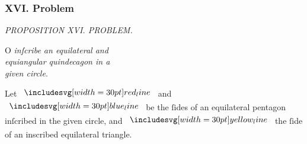 \documentclass[11pt,preview]{standalone}
\begin{document}
\subsubsection{XVI. Problem}

\begin{minipage}[t]{0.43\textwidth}
    \vspace{10pt}
    
\end{minipage}%
\hfill
\begin{minipage}[t]{0.54\textwidth}
    \begin{center}
        \textit{PROPOSITION XVI. PROBLEM.}\label{book4pr16} \\
    \end{center}

    \hfill

    \begin{center}
        \raggedright \lettrine[lines=3, loversize=1, nindent=0pt]{}{}O \textit{inſcribe an equilateral and\\ equiangular quindecagon in a\\ given circle}.
    \end{center}
\end{minipage}%

\hfill

\raggedright Let $\redline$ and $\blueline$ be the ſides of an equilateral pentagon inſcribed in the given circle, and $\yellowline$ the ſide of an inscribed equilateral triangle.
\end{document}
